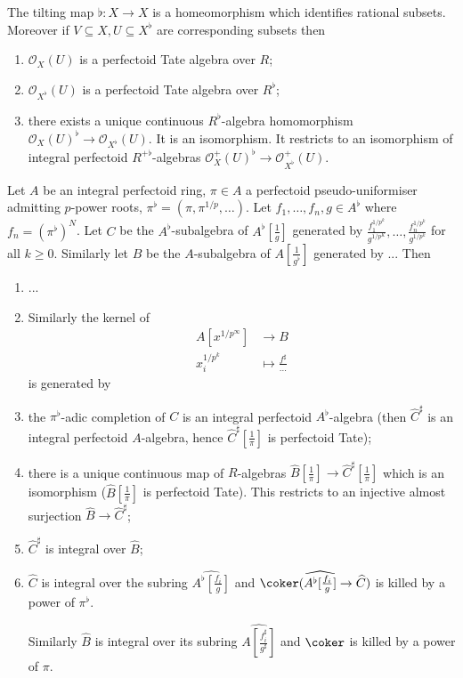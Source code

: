 \documentclass[a4paper]{article}
\newcommand{\tilt}{\flat} %
\newcommand{\sh}[1]{\mathcal{#1}} %
\newcommand{\sh}[1]{\mathcal{#1}} %
\begin{document}
\begin{theorem}
  The tilting map \(\tilt: X \to X\) is a homeomorphism which identifies rational subsets. Moreover if \(V \subseteq X, U \subseteq X^\tilt\) are corresponding subsets then
  \begin{enumerate}
  \item \(\sh O_X(U)\) is a perfectoid Tate algebra over \(R\);
  \item \(\sh O_{X^\tilt}(U)\) is a perfectoid Tate algebra over \(R^\tilt\);
  \item there exists a unique continuous \(R^\tilt\)-algebra homomorphism \(\sh O_X(U)^\tilt \to \sh O_{X^\tilt}(U)\). It is an isomorphism. It restricts to an isomorphism of integral perfectoid \(R^{+ \tilt}\)-algebras \(\sh O_X^+(U)^\tilt \to \sh O_{X^\tilt}^+(U)\).
  \end{enumerate}
\end{theorem}

\begin{proposition}
  Let \(A\) be an integral perfectoid ring, \(\pi \in A\) a perfectoid pseudo-uniformiser admitting \(p\)-power roots, \(\pi^\tilt = (\pi, \pi^{1/p}, \dots)\). Let \(f_1, \dots, f_n, g \in A^\tilt\) where \(f_n= (\pi^\tilt)^N\). Let \(C\) be the \(A^\tilt\)-subalgebra of \(A^\tilt[\frac{1}{g}]\) generated by \(\frac{f_1^{1/p^k}}{g^{1/p^K}}, \dots, \frac{f_n^{1/p^k}}{g^{1/p^k}}\) for all \(k \geq 0\). Similarly let \(B\) be the \(A\)-subalgebra of \(A[\frac{1}{g^\tilt}]\) generated by ... Then
  \begin{enumerate}
  \item ...
  \item Similarly the kernel of
    \begin{align*}
      A[x^{1/p^\infty}] &\to B \\
      x_i^{1/p^k} &\mapsto \frac{{f^{\sharp}}}{...}
    \end{align*}
    is generated by
  \item the \(\pi^\tilt\)-adic completion of \(C\) is an integral perfectoid \(A^\tilt\)-algebra (then \(\widehat C^\sharp\) is an integral perfectoid \(A\)-algebra, hence \(\widehat C^\sharp[\frac{1}{\pi}]\) is perfectoid Tate);
  \item there is a unique continuous map of \(R\)-algebras \(\widehat B[\frac{1}{\pi}] \to \widehat C^\sharp[\frac{1}{\pi}]\) which is an isomorphism (\(\widehat B[\frac{1}{\pi}]\) is perfectoid Tate). This restricts to an injective almost surjection \(\widehat B \to \widehat C^\sharp\);
  \item \(\widehat C^\sharp\) is integral over \(\widehat B\);
  \item \(\widehat C\) is integral over the subring \(\widehat{A^\tilt[\frac{f_i}{g}]}\) and \(\coker(\widehat{A^\tilt[\frac{f_i}{g}]} \to \widehat C)\) is killed by a power of \(\pi^\tilt\).

    Similarly \(\widehat B\) is integral over its subring \(\widehat{A[\frac{f_i^\sharp}{g^\sharp}]}\) and \(\coker\) is killed by a power of \(\pi\).
  \end{enumerate}
\end{proposition}
\end{document}
